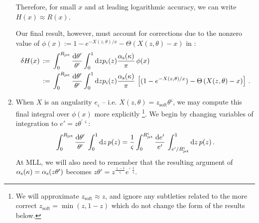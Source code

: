 \begin{enumerate}[label=\alph*)]
    Therefore, for small \(x\) and at leading logarithmic accuracy, we can write \(H(x) \approx R(x)\).

    Our final result, however, must account for corrections due to the nonzero value of \(\phi(x):= 1 - e^{-X(z,\theta)/x} - \Theta(X(z,\theta) - x)\) in :
    \begin{subequations}
    \begin{align}
        \delta H(x)
        \,
        &:=
        \,
        \int_0^{R_\text{jet}} \frac{\dd \theta'}{\theta'}
        \int_0^1 \dd z p_i(z)
        \frac{\alpha_{\mathrm{s}}(\kappa)}{\pi}
        \,
        \phi(x)
        \,
        \\
        &:=
        \,
        \int_0^{R_\text{jet}} \frac{\dd \theta'}{\theta'}
        \int_0^1 \dd z p_i(z)
        \frac{\alpha_{\mathrm{s}}(\kappa)}{\pi}
        \,
        \left[
            (1 - e^{-X(z,\theta)/x})
            -
            \Theta\left(X(z,\theta) - x\right)
        \right]
        \,.
    \end{align}
    \end{subequations}

    \item
        When \(X\) is an angularity \(e_\varsigma\) -- i.e. \(X(z,\theta) = z_\text{soft} \theta^\varsigma\), we may compute this final integral over \(\phi(x)\) more explicitly%
        \footnote{
            We will approximate \(z_\text{soft} \approx z\), and ignore any subtleties related to the more correct \(z_\text{soft} = \min(z, 1-z)\) which do not change the form of the results below.
        }.
        We begin by changing variables of integration to \(e' = z \theta^{\prime\,\varsigma}\):
        \begin{align}
            \int_0^{R_\text{jet}} \frac{\dd \theta'}{\theta'}
            \,
            \int_0^1 \dd z \, p(z)
            =
            \frac{1}{\varsigma}
            \int_0^{R_\text{jet}^\varsigma} \frac{\dd e'}{e'}
            \,
            \int_{e'/R_\text{jet}^\varsigma}^1 \dd z \, p(z)
            \,.
        \end{align}
        At MLL, we will also need to remember that the resulting argument of \(\alpha_{\mathrm{s}}(\kappa) = \alpha_{\mathrm{s}}(z\theta')\) becomes \(z \theta' = z^{\frac{\varsigma - 1}{\varsigma}} e^{\prime \,\, \frac{1}{\varsigma}}\).


\end{enumerate}
